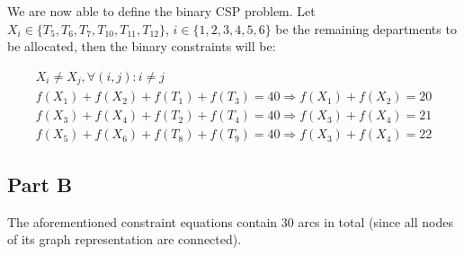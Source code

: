 We are now able to define the binary CSP problem. Let $X_i \in \{T_5, T_6, T_7, T_{10}, T_{11}, T_{12}\}$, $i \in \{1, 2, 3, 4, 5, 6\}$ be the remaining departments to be allocated, then the binary constraints will be:

\[
	\begin{array}{ll}
		X_i \ne X_j, \forall (i,j) : i \ne j \\
		f(X_1) + f(X_2) + f(T_1) + f(T_3) = 40 \Rightarrow f(X_1) + f(X_2) = 20 \\
		f(X_3) + f(X_4) + f(T_2) + f(T_4) = 40 \Rightarrow f(X_3) + f(X_4) = 21 \\
		f(X_5) + f(X_6) + f(T_8) + f(T_9) = 40 \Rightarrow f(X_3) + f(X_4) = 22
	\end{array}
\]

\subsection*{Part B}

The aforementioned constraint equations contain 30 arcs in total (since all nodes of its graph representation are connected). 


